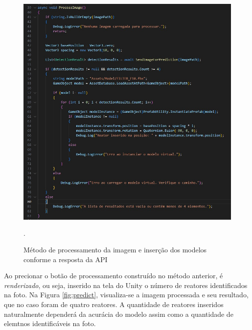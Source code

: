 \begin{figure}[!h]
    \centering
    \begin{minipage}{0.7\linewidth}
    \centering
    \captionsetup{justification=centering,margin=0.5cm,font=small}
    \includegraphics[width=1\linewidth]{img/cap5/process-image.jpeg}
    \caption{Método de processamento da imagem e inserção dos modelos conforme a resposta da API}.
    \label{fig:metodo-disposicao}
    \end{minipage}
\end{figure}


Ao precionar o botão de processamento construído no método anterior, é \textit{renderizado}, ou seja, inserido na tela do Unity o número de reatores identificados na foto. Na Figura \ref{fig:predict}, visualiza-se a imagem processada e seu resultado, que no caso foram de quatro reatores. A quantidade de reatores inseridos naturalmente dependerá da acurácia do modelo assim como a quantidade de elemtnos identificáveis na foto.


